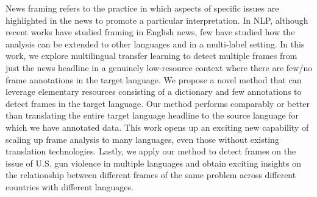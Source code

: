 News framing refers to the practice in which aspects of specific issues are highlighted in the news to promote a particular interpretation. In NLP, although recent works have studied framing in English news, few have studied how the analysis can be extended to other languages and in a multi-label setting. In this work, we explore multilingual transfer learning to detect multiple frames from just the news headline in a genuinely low-resource context where there are few/no frame annotations in the target language. We propose a novel method that can leverage elementary resources consisting of a dictionary and few annotations to detect frames in the target language. Our method performs comparably or better than translating the entire target language headline to the source language for which we have annotated data. This work opens up an exciting new capability of scaling up frame analysis to many languages, even those without existing translation technologies. Lastly, we apply our method to detect frames on the issue of U.S. gun violence in multiple languages and obtain exciting insights on the relationship between different frames of the same problem across different countries with different languages.
